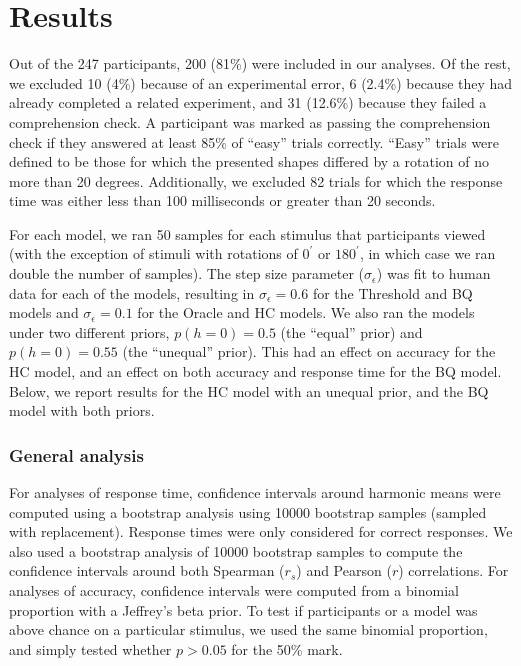 \documentclass[10pt,letterpaper]{article}
\newcommand{\Oc}[0]{Oracle}
\newcommand{\Th}[0]{Threshold}
\newcommand{\Hc}[0]{HC}
\newcommand{\Bq}[0]{BQ}
\begin{document}
\section{Results}

Out of the 247 participants, 200 (81\%) were included in our
analyses. Of the rest, we excluded 10 (4\%) because of an experimental
error, 6 (2.4\%) because they had already completed a related
experiment, and 31 (12.6\%) because they failed a comprehension
check. A participant was marked as passing the comprehension check if
they answered at least 85\% of ``easy'' trials correctly. ``Easy''
trials were defined to be those for which the presented shapes
differed by a rotation of no more than 20 degrees. Additionally, we
excluded 82 trials for which the response time was either less than
100 milliseconds or greater than 20 seconds.

For each model, we ran 50 samples for each stimulus that participants
viewed (with the exception of stimuli with rotations of $0^\prime$ or
$180^\prime$, in which case we ran double the number of samples). The
step size parameter ($\sigma_\epsilon$) was fit to human data for each
of the models, resulting in $\sigma_\epsilon=0.6$ for the \Th{} and
\Bq{} models and $\sigma_\epsilon=0.1$ for the \Oc{} and \Hc{}
models. We also ran the models under two different priors,
$p(h=0)=0.5$ (the ``equal'' prior) and $p(h=0)=0.55$ (the ``unequal''
prior). This had an effect on accuracy for the \Hc{} model, and an
effect on both accuracy and response time for the \Bq{} model. Below,
we report results for the \Hc{} model with an unequal prior, and the
\Bq{} model with both priors.

\subsubsection{General analysis}

For analyses of response time, confidence intervals around harmonic
means were computed using a bootstrap analysis using 10000 bootstrap
samples (sampled with replacement). Response times were only
considered for correct responses.  We also used a bootstrap analysis
of 10000 bootstrap samples to compute the confidence intervals around
both Spearman ($r_s$) and Pearson ($r$) correlations.  For analyses of
accuracy, confidence intervals were computed from a binomial
proportion with a Jeffrey's beta prior.  To test if participants or a
model was above chance on a particular stimulus, we used the same
binomial proportion, and simply tested whether $p>0.05$ for the 50\%
mark.
\end{document}
